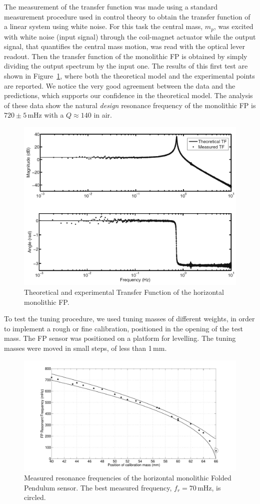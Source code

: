 The measurement of the transfer function was made using a standard measurement procedure used in control theory to obtain the transfer function of a linear system using white noise. For this task the central mass, $m_{p}$, was excited with white noise (input signal) through the coil-magnet actuator while the output signal, that quantifies the central mass motion, was read with the optical lever readout. Then the transfer function of the monolithic FP is obtained by simply dividing the output spectrum by the input one. The results of this first test are shown in Figure~\ref{fig:TF}, where both the theoretical model and the experimental points are reported. We notice the very good agreement between  the data and the predictions, which supports our confidence in the  theoretical model. The analysis of these data show the natural \emph{design} resonance frequency of the monolithic FP is $720 \pm 5$\,mHz with a $Q \approx 140$ in air.

\begin{figure}[h!tb]
	\centering
		\includegraphics[width=8.5 cm]{Sec_Suspensions/Figures/FP_TF.pdf}		
   	\caption{Theoretical and experimental Transfer Function of the horizontal monolithic FP.}
	  \label{fig:TF}
\end{figure}

To test the tuning procedure, we used tuning masses of different weights, in order to implement a rough or fine calibration, positioned in the opening of the test mass. The FP sensor was positioned on a platform for levelling. The tuning masses were moved in small steps, of less than 1\,mm. 
\begin{figure}[!htb]
  \centering
	   \includegraphics[width=8.5 cm]{Sec_Suspensions/Figures/FP_Frequency.pdf}
	   \caption{\label{fig:FP_Experimental_Frequency_Tuning} Measured resonance frequencies of the horizontal monolithic Folded Pendulum sensor. The best measured frequency, $f_{r} = 70$\,mHz, is circled.}
\end{figure}

